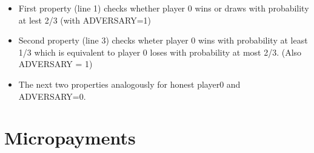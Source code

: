 \documentclass{article}
\begin{document}
\begin{itemize}
\item First property (line 1) checks whether player 0 wins or draws with probability at lest 2/3 (with ADVERSARY=1)
\item Second property (line 3) checks wheter player 0 wins with probability at least 1/3 which is equivalent to player 0
loses with probability at most 2/3. (Also ADVERSARY = 1)
\item The next two properties analogously for honest player0 and ADVERSARY=0.
\end{itemize}


\section{Micropayments}


\end{document}
